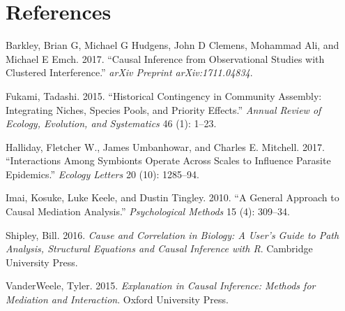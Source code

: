 \documentclass[]{article}
\begin{document}
\hypertarget{references}{%
\section*{References}\label{references}}

\hypertarget{refs}{}
\leavevmode\hypertarget{ref-barkley2017causal}{}%
Barkley, Brian G, Michael G Hudgens, John D Clemens, Mohammad Ali, and
Michael E Emch. 2017. ``Causal Inference from Observational Studies with
Clustered Interference.'' \emph{arXiv Preprint arXiv:1711.04834}.

\leavevmode\hypertarget{ref-fukami2015historical}{}%
Fukami, Tadashi. 2015. ``Historical Contingency in Community Assembly:
Integrating Niches, Species Pools, and Priority Effects.'' \emph{Annual
Review of Ecology, Evolution, and Systematics} 46 (1): 1--23.

\leavevmode\hypertarget{ref-halliday2017interactions}{}%
Halliday, Fletcher W., James Umbanhowar, and Charles E. Mitchell. 2017.
``Interactions Among Symbionts Operate Across Scales to Influence
Parasite Epidemics.'' \emph{Ecology Letters} 20 (10): 1285--94.

\leavevmode\hypertarget{ref-imai2010general}{}%
Imai, Kosuke, Luke Keele, and Dustin Tingley. 2010. ``A General Approach
to Causal Mediation Analysis.'' \emph{Psychological Methods} 15 (4):
309--34.

\leavevmode\hypertarget{ref-shipley2016cause}{}%
Shipley, Bill. 2016. \emph{Cause and Correlation in Biology: A User's
Guide to Path Analysis, Structural Equations and Causal Inference with
R}. Cambridge University Press.

\leavevmode\hypertarget{ref-vanderweele2015explanation}{}%
VanderWeele, Tyler. 2015. \emph{Explanation in Causal Inference: Methods
for Mediation and Interaction}. Oxford University Press.
\end{document}
